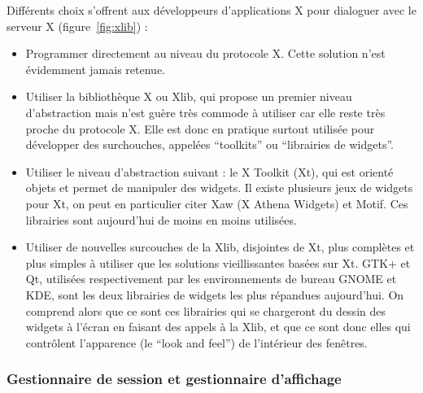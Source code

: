 Différents choix s'offrent aux développeurs d'applications X pour dialoguer avec le serveur X (figure~\ref{fig:xlib}) \cite{XHowto} :
\begin{itemize} \vspace{1ex} \itemsep1ex
 \item Programmer directement au niveau du protocole X. Cette solution n'est évidemment jamais retenue.
 \item Utiliser la bibliothèque X ou Xlib, qui propose un premier niveau d'abstraction mais n'est guère très commode à utiliser car elle reste très proche du protocole X. Elle est donc en pratique surtout utilisée pour développer des surchouches, appelées ``toolkits'' ou ``librairies de widgets''.
 \item Utiliser le niveau d'abstraction suivant : le X Toolkit (Xt), qui est orienté objets et permet de manipuler des widgets. Il existe plusieurs jeux de widgets pour Xt, on peut en particulier citer Xaw (X Athena Widgets) et Motif. Ces librairies sont aujourd'hui de moins en moins utilisées.
 \item Utiliser de nouvelles surcouches de la Xlib, disjointes de Xt, plus complètes et plus simples à utiliser que les solutions vieillissantes basées sur Xt. GTK+ et Qt, utilisées respectivement par les environnements de bureau GNOME et KDE, sont les deux librairies de widgets les plus répandues aujourd'hui. On comprend alors que ce sont ces librairies qui se chargeront du dessin des widgets à l'écran en faisant des appels à la Xlib, et que ce sont donc elles qui contrôlent l'apparence (le ``look and feel'') de l'intérieur des fenêtres.
\end{itemize}

\subsubsection{Gestionnaire de session et gestionnaire d'affichage}

